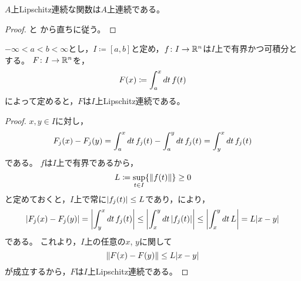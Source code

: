 \documentclass[b5paper,draft,oneside,openany]{ltjsbook} %
\begin{document}
\begin{cor}
    $A$上Lipschitz連続な関数は$A$上連続である。
    \begin{proof}
        と
        から直ちに従う。
    \end{proof}
\end{cor}

\begin{prop}
    $-\infty<a<b<\infty$とし，$I\coloneqq [a,b]$と定め，$f\colon I\to \mathbb{R}^n$は$I$上で有界かつ可積分とする。
    $F\colon I\to \mathbb{R}^n$を，
    \begin{equation}
        \fun{F}{x}\coloneqq \int_a^x dt\, \fun{f}{t}
    \end{equation}
    によって定めると，$F$は$I$上Lipschitz連続である。
    \begin{proof}
        $x,y\in I$に対し，
        \begin{equation}
            \fun{F_j}{x}-\fun{F_j}{y}=\int_a^x dt\, \fun{f_j}{t} - \int_a^y dt\, \fun{f_j}{t}=\int_y^x dt\, \fun{f_j}{t}
        \end{equation}
        である。
        $f$は$I$上で有界であるから，
        \begin{equation}
            L\coloneqq \sup_{t\in I}\bra{\norm{\fun{f}{t}}}\geq 0
        \end{equation}
        と定めておくと，$I$上で常に$\abs{\fun{f_j}{t}}\leq L$であり，により，
        \begin{equation}
            \abs{\fun{F_j}{x}-\fun{F_j}{y}}=\abs{\int_y^x dt\, \fun{f_j}{t}}
            \leq \abs{\int_x^y dt\, \abs{\fun{f_j}{t}}}\leq \abs{\int_x^y dt\, L}
            = L\abs{x-y}
        \end{equation}
        である。
        これより，$I$上の任意の$x$, $y$に関して
        \begin{equation}
            \norm{\fun{F}{x}-\fun{F}{y}}\leq L\abs{x-y}
        \end{equation}
        が成立するから，$F$は$I$上Lipschitz連続である。
    \end{proof}
\end{prop}
\end{document}
